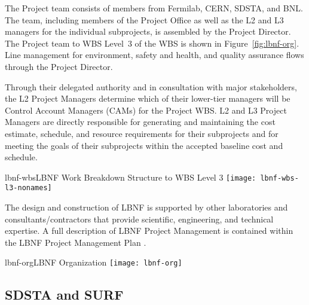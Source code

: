 The Project team consists of members from Fermilab, CERN, SDSTA, and BNL.  The team, including members of the Project Office as well as the L2 and L3 managers for the individual subprojects, is assembled by the Project Director. The Project team to WBS Level~3 of the WBS is shown in Figure~\ref{fig:lbnf-org}. 
Line management for environment, safety and health, and quality assurance flows through the Project Director. 


Through their delegated authority and in consultation with major stakeholders, the L2 Project Managers determine which of their lower-tier managers will be Control Account Managers (CAMs) for the Project WBS. L2 and L3 Project Managers are directly responsible for generating and maintaining the cost estimate, schedule, and resource requirements for their subprojects and for meeting the goals of their subprojects within the accepted baseline cost and schedule. 

\begin{cdrfigure}{lbnf-wbs}{LBNF Work Breakdown Structure to WBS Level 3}
  \texttt{[image: lbnf-wbs-l3-nonames]}
\end{cdrfigure}

The design and construction of LBNF is supported by other laboratories and consultants/contractors that provide scientific, engineering, and technical expertise. A full description of LBNF Project Management is contained within the LBNF Project Management Plan \fixme{[ref]}.

\begin{cdrfigure}{lbnf-org}{LBNF Organization}
  \texttt{[image: lbnf-org]}
\end{cdrfigure}




\subsection{SDSTA and SURF}

